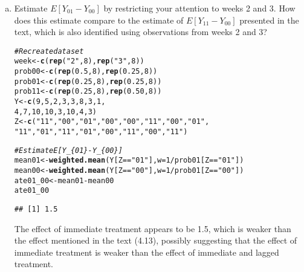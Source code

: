 \documentclass[11pt,notitlepage]{article}\usepackage[]{graphicx}\usepackage[]{color}
\makeatletter
\newcommand{\hlnum}[1]{\textcolor[rgb]{0.686,0.059,0.569}{#1}}%
\newcommand{\hlstr}[1]{\textcolor[rgb]{0.192,0.494,0.8}{#1}}%
\newcommand{\hlcom}[1]{\textcolor[rgb]{0.678,0.584,0.686}{\textit{#1}}}%
\newcommand{\hlopt}[1]{\textcolor[rgb]{0,0,0}{#1}}%
\newcommand{\hlstd}[1]{\textcolor[rgb]{0.345,0.345,0.345}{#1}}%
\newcommand{\hlkwb}[1]{\textcolor[rgb]{0.69,0.353,0.396}{#1}}%
\newcommand{\hlkwc}[1]{\textcolor[rgb]{0.333,0.667,0.333}{#1}}%
\newcommand{\hlkwd}[1]{\textcolor[rgb]{0.737,0.353,0.396}{\textbf{#1}}}%
\newenvironment{kframe}{%
 \def\at@end@of@kframe{}%
 \ifinner\ifhmode%
  \def\at@end@of@kframe{\end{minipage}}%
  \begin{minipage}{\columnwidth}%
 \fi\fi%
 \def\FrameCommand##1{\hskip\@totalleftmargin \hskip-\fboxsep
 \colorbox{shadecolor}{##1}\hskip-\fboxsep
     \hskip-\linewidth \hskip-\@totalleftmargin \hskip\columnwidth}%
 \MakeFramed {\advance\hsize-\width
   \@totalleftmargin\z@ \linewidth\hsize
   \@setminipage}}%
 {\par\unskip\endMakeFramed%
 \at@end@of@kframe}
\newenvironment{knitrout}{}{} %
\makeatother
\begin{document}
\begin{enumerate}[a)]
\item Estimate $E[Y_{01}-Y_{00}]$ by restricting your attention to weeks 2 and 3. How does this estimate compare to the estimate of $E[Y_{11} - Y_{00}]$ presented in the text, which is also identified using observations from weeks 2 and 3?

\begin{knitrout}
\color{fgcolor}\begin{kframe}
\begin{alltt}
\hlcom{# Recreate dataset}
\hlstd{week} \hlkwb{<-} \hlkwd{c}\hlstd{(}\hlkwd{rep}\hlstd{(}\hlstr{"2"}\hlstd{,} \hlnum{8}\hlstd{),} \hlkwd{rep}\hlstd{(}\hlstr{"3"}\hlstd{,} \hlnum{8}\hlstd{))}
\hlstd{prob00} \hlkwb{<-} \hlkwd{c}\hlstd{(}\hlkwd{rep}\hlstd{(}\hlnum{0.5}\hlstd{,} \hlnum{8}\hlstd{),} \hlkwd{rep}\hlstd{(}\hlnum{0.25}\hlstd{,} \hlnum{8}\hlstd{))}
\hlstd{prob01} \hlkwb{<-} \hlkwd{c}\hlstd{(}\hlkwd{rep}\hlstd{(}\hlnum{0.25}\hlstd{,} \hlnum{8}\hlstd{),} \hlkwd{rep}\hlstd{(}\hlnum{0.25}\hlstd{,} \hlnum{8}\hlstd{))}
\hlstd{prob11} \hlkwb{<-} \hlkwd{c}\hlstd{(}\hlkwd{rep}\hlstd{(}\hlnum{0.25}\hlstd{,} \hlnum{8}\hlstd{),} \hlkwd{rep}\hlstd{(}\hlnum{0.50}\hlstd{,} \hlnum{8}\hlstd{))}
\hlstd{Y} \hlkwb{<-} \hlkwd{c}\hlstd{(}\hlnum{9}\hlstd{,}\hlnum{5}\hlstd{,}\hlnum{2}\hlstd{,}\hlnum{3}\hlstd{,}\hlnum{3}\hlstd{,}\hlnum{8}\hlstd{,}\hlnum{3}\hlstd{,}\hlnum{1}\hlstd{,}
       \hlnum{4}\hlstd{,}\hlnum{7}\hlstd{,}\hlnum{10}\hlstd{,}\hlnum{10}\hlstd{,}\hlnum{3}\hlstd{,}\hlnum{10}\hlstd{,}\hlnum{4}\hlstd{,}\hlnum{3}\hlstd{)}
\hlstd{Z} \hlkwb{<-} \hlkwd{c}\hlstd{(}\hlstr{"11"}\hlstd{,} \hlstr{"00"}\hlstd{,} \hlstr{"01"}\hlstd{,} \hlstr{"00"}\hlstd{,} \hlstr{"00"}\hlstd{,} \hlstr{"11"}\hlstd{,} \hlstr{"00"}\hlstd{,} \hlstr{"01"}\hlstd{,}
       \hlstr{"11"}\hlstd{,} \hlstr{"01"}\hlstd{,} \hlstr{"11"}\hlstd{,} \hlstr{"01"}\hlstd{,} \hlstr{"00"}\hlstd{,} \hlstr{"11"}\hlstd{,} \hlstr{"00"}\hlstd{,} \hlstr{"11"}\hlstd{)}

\hlcom{# Estimate E[Y_\{01\}-Y_\{00\}]}
\hlstd{mean01} \hlkwb{<-} \hlkwd{weighted.mean}\hlstd{(Y[Z}\hlopt{==}\hlstr{"01"}\hlstd{],} \hlkwc{w}\hlstd{=}\hlnum{1}\hlopt{/}\hlstd{prob01[Z}\hlopt{==}\hlstr{"01"}\hlstd{])}
\hlstd{mean00} \hlkwb{<-} \hlkwd{weighted.mean}\hlstd{(Y[Z}\hlopt{==}\hlstr{"00"}\hlstd{],} \hlkwc{w}\hlstd{=}\hlnum{1}\hlopt{/}\hlstd{prob01[Z}\hlopt{==}\hlstr{"00"}\hlstd{])}
\hlstd{ate01_00} \hlkwb{<-} \hlstd{mean01} \hlopt{-} \hlstd{mean00}
\hlstd{ate01_00}
\end{alltt}
\begin{verbatim}
## [1] 1.5
\end{verbatim}
\end{kframe}
\end{knitrout}
The effect of immediate treatment appears to be 1.5, which is weaker than the effect mentioned in the text (4.13), possibly suggesting that the effect of immediate treatment is weaker than the effect of immediate and lagged treatment.


\end{enumerate}
\end{document}
